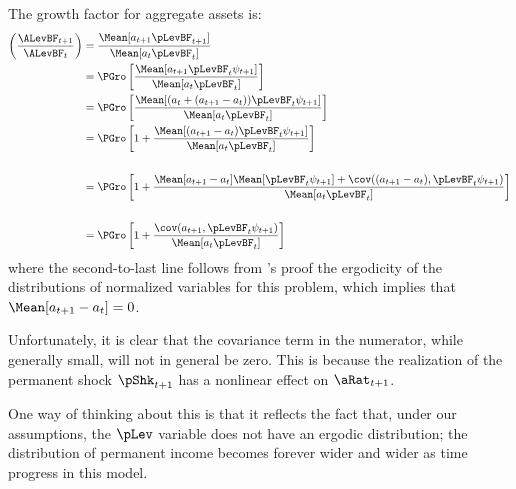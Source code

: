 \documentclass[BufferStockTheory]{subfiles}
\begin{document}
{  The growth factor for aggregate assets is:
  \begin{align*}
    \left(\frac{\ALevBF_{t+1}}{\ALevBF_{t}}\right)  & = \frac{\Mean[a_{t+1} \pLevBF_{t+1}]}{\Mean[a_{t} \pLevBF_{t}]}   \\ 
                                                    & = \PGro \left[\frac{\Mean[a_{t+1}\pLevBF_{t}\psi_{t+1}]}{\Mean[a_{t}\pLevBF_{t}]}\right] \\
                                                    & = \PGro \left[\frac{\Mean[(a_{t}+(a_{t+1}-a_{t}))\pLevBF_{t}\psi_{t+1}]}{\Mean[a_{t}\pLevBF_{t}]}\right] \\
                                                    & = \PGro \left[1+\frac{\Mean[(a_{t+1}-a_{t})\pLevBF_{t}\psi_{t+1}]}{\Mean[a_{t}\pLevBF_{t}]}\right] \\  
    \\  & = \PGro \left[1+\frac{\Mean[a_{t+1}-a_{t}]\Mean[\pLevBF_{t}\psi_{t+1}]+\cov((a_{t+1}-a_{t}),\pLevBF_{t}\psi_{t+1})}{\Mean[a_{t}\pLevBF_{t}]}\right] \\
    \\  & = \PGro \left[1+\frac{\cov(a_{t+1},\pLevBF_{t}\psi_{t+1})}{\Mean[a_{t}\pLevBF_{t}]}\right] \\    
  \end{align*}
  where the second-to-last line follows from \cite{szeidlInvariant}'s proof the ergodicity of the distributions of normalized
  variables for this problem, which implies that $\Mean[a_{t+1}-a_{t}]=0$.

  Unfortunately, it is clear that the covariance term in the numerator, while generally small, will not in general be zero.  This is because the realization of the permanent shock $\pShk_{t+1}$ has a nonlinear effect on $\aRat_{t+1}$.

  One way of thinking about this is that it reflects the fact that, under our assumptions, the $\pLev$ variable does not have an ergodic distribution;
  the distribution of permanent income becomes forever wider and wider as time progress in this model.

}
\end{document}
